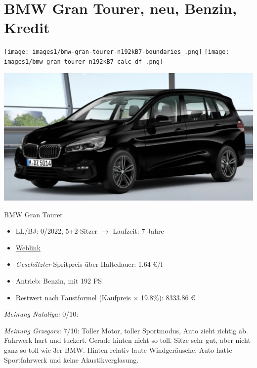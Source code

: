 \documentclass[landscape, DIV=99, 14pt]{scrartcl}
\begin{document}
\pagebreak


\twocolumn

\section*{BMW Gran Tourer, neu, Benzin, Kredit}
\begin{center}
\texttt{[image: images1/bmw-gran-tourer-n192kB7-boundaries\_.png]}
\null
\vspace{0.5cm}
\texttt{[image: images1/bmw-gran-tourer-n192kB7-calc\_df\_.png]}
\end{center}

\pagebreak
\begin{center}
\includegraphics[width=0.9\columnwidth]{cars/bmw-gran-tourer-mulfinger.png}

BMW Gran Tourer
\end{center}

\begin{itemize}
    \item LL/BJ: 0/2022, 5+2-Sitzer $\rightarrow$ Laufzeit: 7 Jahre
    \item \href{https://mulfinger.de/de/fahrzeugangebot/BMW/220i-GranTourer-Sport-DKG-HUD-LED-ParkAssNavi/page1/details-p5clkem9?manufacturer=5&model=2534&view=list}{Weblink}
    \item \emph{Gesch\"atzter} Spritpreis \"uber Haltedauer: 1.64 \euro{}/l
    \item Antrieb: Benzin, mit 192 PS
    \item Restwert nach Faustformel (Kaufpreis $\times$ 19.8\%): 8333.86 \euro{}
\end{itemize}

\begin{small}
\emph{Meinung Nataliya:} 0/10: 
        
\emph{Meinung Grzegorz:} 7/10: Toller Motor, toller Sportmodus, Auto zieht richtig ab. Fahrwerk hart und tuckert. Gerade hinten nicht so toll. Sitze sehr gut, aber nicht ganz so toll wie 3er BMW. Hinten relativ laute Windgeräusche. Auto hatte Sportfahrwerk und keine Akustikverglasung.
\end{small}
\end{document}
